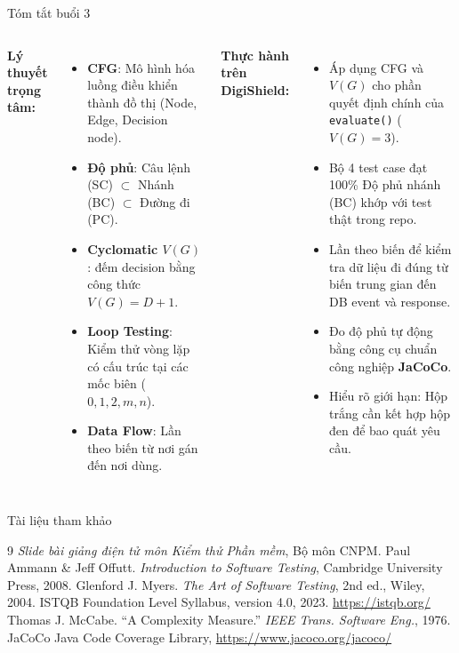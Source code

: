 \documentclass[aspectratio=169,12pt]{beamer}
\begin{document}
\begin{frame}[shrink=12]{Tóm tắt buổi 3}
  \begin{columns}[T]
    \textbf{Lý thuyết trọng tâm:}
    \begin{itemize}\setlength{\itemsep}{0.2em}
      \item \textbf{CFG}: Mô hình hóa luồng điều khiển thành đồ thị (Node, Edge, Decision node).
      \item \textbf{Độ phủ}: Câu lệnh (SC) $\subset$ Nhánh (BC) $\subset$ Đường đi (PC).
      \item \textbf{Cyclomatic $V(G)$}: đếm decision bằng công thức $V(G)=D+1$.
      \item \textbf{Loop Testing}: Kiểm thử vòng lặp có cấu trúc tại các mốc biên ($0, 1, 2, m, n$).
      \item \textbf{Data Flow}: Lần theo biến từ nơi gán đến nơi dùng.
    \end{itemize}

    \textbf{Thực hành trên DigiShield:}
    \begin{itemize}\setlength{\itemsep}{0.2em}
      \item Áp dụng CFG và $V(G)$ cho phần quyết định chính của \texttt{evaluate()} ($V(G)=3$).
      \item Bộ 4 test case đạt 100\% Độ phủ nhánh (BC) khớp với test thật trong repo.
      \item Lần theo biến để kiểm tra dữ liệu đi đúng từ biến trung gian đến DB event và response.
      \item Đo độ phủ tự động bằng công cụ chuẩn công nghiệp \textbf{JaCoCo}.
      \item Hiểu rõ giới hạn: Hộp trắng cần kết hợp hộp đen để bao quát yêu cầu.
    \end{itemize}
  \end{columns}
\end{frame}

\begin{frame}{Tài liệu tham khảo}
  \vspace*{-0.4em}
  \footnotesize
  \begin{thebibliography}{9}
      \textit{Slide bài giảng điện tử môn Kiểm thử Phần mềm}, Bộ môn CNPM.
      Paul Ammann \& Jeff Offutt.
      \textit{Introduction to Software Testing}, Cambridge University Press, 2008.
      Glenford J. Myers.
      \textit{The Art of Software Testing}, 2nd ed., Wiley, 2004.
      ISTQB Foundation Level Syllabus, version 4.0, 2023. \url{https://istqb.org/}
      Thomas J. McCabe. ``A Complexity Measure.'' \textit{IEEE Trans. Software Eng.}, 1976.
      JaCoCo Java Code Coverage Library, \url{https://www.jacoco.org/jacoco/}
  \end{thebibliography}
\end{frame}
\end{document}
